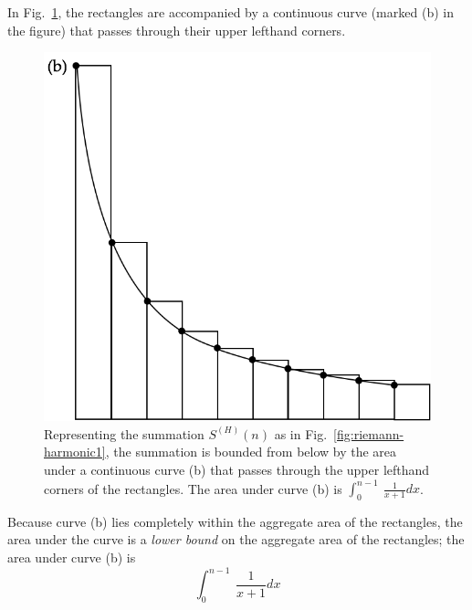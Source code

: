\begin{enumerate}
In Fig.~\ref{fig:riemann-harmonic2}, the rectangles are accompanied by
a continuous curve (marked (b) in the figure) that passes through
their upper lefthand corners.
\begin{figure}[htb]
\centerline{
\includegraphics[scale=0.3]{FiguresMaths/RiemannSum2}
}
\caption{Representing the summation $S^{(H)}(n)$ as in
  Fig.~\ref{fig:riemann-harmonic1}, the summation is bounded from
  below by the area under a continuous curve (b) that passes through
  the upper lefthand corners of the rectangles.  The area under curve
  (b) is $\int_0^{n-1} \ \frac{1}{x+1} dx$.}
\label{fig:riemann-harmonic2}
\end{figure}
Because curve (b) lies completely within the aggregate area of the
rectangles, the area under the curve is a {\em lower bound} on the
aggregate area of the rectangles; the area under curve (b) is
\[ \int_0^{n-1}  \ \frac{1}{x+1} dx \]
  \end{enumerate}
%

\medskip

